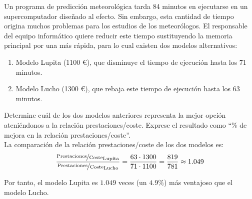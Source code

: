 \begin{ejercicio}
Un programa de predicción meteorológica tarda 84 minutos en ejecutarse en un supercomputador diseñado al efecto. Sin embargo, esta cantidad de tiempo origina muchos problemas para los estudios de los meteorólogos. El responsable del equipo informático quiere reducir este tiempo sustituyendo la memoria principal por una más rápida, para lo cual existen dos modelos alternativos:
\begin{enumerate}
    \item Modelo Lupita (1100 \euro), que disminuye el tiempo de ejecución hasta los 71 minutos.
    \item Modelo Lucho (1300 \euro), que rebaja este tiempo de ejecución hasta los 63 minutos.
\end{enumerate}
Determine cuál de los dos modelos anteriores representa la mejor opción ateniéndonos a la relación prestaciones/coste. Exprese el resultado como ``\% de mejora en la relación prestaciones/coste''.\\

La comparación de la relación prestaciones/coste de los dos modelos es:
\begin{equation*}
    \frac{\nicefrac{\text{Prestaciones}}{\text{Coste}}_{\text{Lupita}}}{\nicefrac{\text{Prestaciones}}{\text{Coste}}_{\text{Lucho}}} = \dfrac{63\cdot 1300}{71\cdot 1100} = \dfrac{819}{781} \approx 1.049
\end{equation*}

Por tanto, el modelo Lupita es $1.049$ veces (un $4.9\%$) más ventajoso que el modelo Lucho.
\end{ejercicio}

